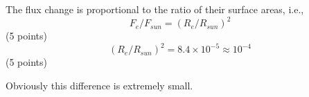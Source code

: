 The flux change is proportional to the ratio of their surface areas, i.e.,
\[ F_e / F_{sun} = (R_e / R_{sun})^2 \]
\hfill(5 points)
\[ (R_e / R_{sun})^2 = 8.4\times10^{-5} \approx 10^{-4} \]
\hfill(5 points)

Obviously this difference is extremely small.
